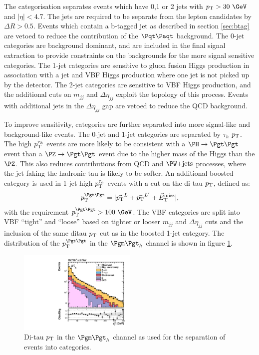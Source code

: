 The categorisation separates events which have 0,1 or 2 jets with $\pt>30~\GeV$
and $|\eta| < 4.7$. The jets are required to be separate from the lepton
candidates by $\Delta R > 0.5$. Events which contain a b-tagged jet as described in section
\ref{sec:btag} are vetoed to reduce the contribution of the $\ttbar$ background. 
The 0-jet categories are background dominant, and are included in the final
signal extraction to provide constraints on the backgrounds for the more signal
sensitive categories. The 1-jet categories are sensitive to gluon fusion Higgs
production in association with a jet and VBF Higgs production where one jet is
not picked up by the detector. The 2-jet categories are sensitive to
\ac{VBF} Higgs production, and the additional cuts on $m_{jj}$ and $\Delta
\eta_{jj}$ exploit the topology of this process. Events with additional jets in
the $\Delta \eta_{jj}$ gap are vetoed to reduce the \ac{QCD} background.

To improve sensitivity, categories are further separated into more signal-like
and background-like events. The 0-jet and 1-jet categories are separated by
$\tau_{h}$ $p_{\mathrm{T}}$. The high $p_{\mathrm{T}}^{\tau_{h}}$ events are more likely to be
consistent with a $\HToTauTau$ event than a $\ZToTauTau$ event due to the higher
mass of the Higgs than the $\PZ$. This also reduces contributions from \ac{QCD}
and $\WJets$ processes, where the jet faking the hadronic tau is likely to be
softer. An additional boosted category is used in 1-jet high $p_{\mathrm{T}}^{\tau_{h}}$
events with a cut on the di-tau $p_{\mathrm{T}}$, defined as:
\begin{equation}
\pt^{\Pgt\Pgt} = |\vec{\pt}^{L} + \vec{\pt}^{L'}+\vecMET|,
\end{equation}
with the requirement $\pt^{\Pgt\Pgt}>100~\GeV$. The VBF categories are split into VBF
``tight'' and ``loose'' based on tighter or looser $m_{jj}$ and
$\Delta\eta_{jj}$ cuts and the inclusion of the same ditau $p_{\mathrm{T}}$ cut as in the
boosted 1-jet category. The distribution of the $\pt^{\Pgt\Pgt}$ in the
$\mutau$ channel is shown in figure \ref{fig:ditaupt}. 

\begin{figure}[htb]
\begin{center}
    \includegraphics[width=0.5\textwidth]
      {plots/htt-sm/pt_tt_inclusive_mt_2012_log.pdf}
\end{center}
\caption{
 Di-tau $p_{\mathrm{T}}$ in the $\mutau$ channel as used for the separation of events into
 categories. 
}
\label{fig:ditaupt}
\end{figure}


